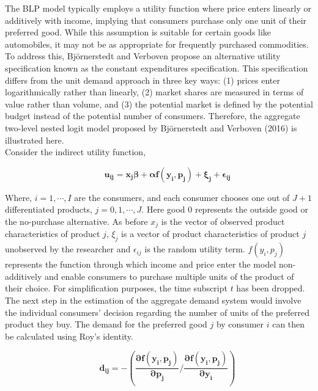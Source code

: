 \documentclass[a4paper,11pt]{article}
\begin{document}
    The BLP model typically employs a utility function where price enters linearly or additively with income, implying that consumers purchase only one unit of their preferred good. While this assumption is suitable for certain goods like automobiles, it may not be as appropriate for frequently purchased commodities. To address this, Björnerstedt and Verboven propose an alternative utility specification known as the constant expenditures specification. This specification differs from the unit demand approach in three key ways: (1) prices enter logarithmically rather than linearly, (2) market shares are measured in terms of value rather than volume, and (3) the potential market is defined by the potential budget instead of the potential number of consumers. Therefore, the aggregate two-level nested logit model proposed by Björnerstedt and Verboven (2016) is illustrated here.\\

    Consider the indirect utility function,

    \begin{equation*}
        \qquad \mathbf{u_{ij} = x_{j}\beta + \alpha f(y_{i},p_{j}) + \xi_{j} + \epsilon_{ij}}
    \end{equation*}

    Where, $i = 1, \cdots, I$ are the consumers, and each consumer chooses one out of $J+1$ differentiated products, $j = 0, 1, \cdots, J$. Here good $0$ represents the outside good or the no-purchase alternative. As before $x_{j}$ is the vector of observed product characteristics of product $j$, $\xi_{j}$ is a vector of product characteristics of product $j$ unobserved by the researcher and $\epsilon_{ij}$ is the random utility term. $f(y_{i},p_{j})$ represents the function through which income and price enter the model non-additively and enable consumers to purchase multiple units of the product of their choice. For simplification purposes, the time subscript $t$ has been dropped.\\

    The next step in the estimation of the aggregate demand system would involve the individual consumers' decision regarding the number of units of the preferred product they buy. The demand for the preferred good $j$ by consumer $i$ can then be calculated using Roy's identity.

    \begin{equation*}
        \qquad \mathbf{d_{ij} = - \left(\dfrac{\partial f(y_{i}, p_{j})}{\partial p_{j}} \bigg/ \dfrac{\partial f(y_{i}, p_{j})}{\partial y_{i}}\right)}
    \end{equation*}
\end{document}
